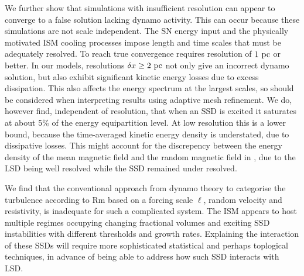 \documentclass[preprint2]{aastex63}
\newcommand\pc{~ {\rm pc}}
\newcommand\dx{ {\delta x}}
\begin{document}
We further show that simulations with insufficient resolution can appear to
converge to a false solution lacking dynamo activity. This can occur because
these simulations are not scale independent.
The SN energy input and the physically motivated ISM cooling processes impose
length and time scales that must be adequately resolved.
To reach true convergence requires resolution of $1\pc$ or better.
In our models, resolutions $\dx\geq2\pc$ not only give an incorrect dynamo
solution, but also exhibit significant kinetic energy losses due to excess
dissipation.
This also affects the energy spectrum at the largest scales, so should be 
considered when interpreting results using adaptive mesh refinement.
%
We do, however find, independent of resolution, that when an SSD is excited it
saturates at about 5\% of the energy equipartition level.
At low resolution this is a lower bound, because the time-averaged kinetic
energy density is understated, due to dissipative losses.
This might account for the discrepency between the energy density of the mean
magnetic field and the random magnetic field in \citet{Gent:2013b}, due to the
LSD being well resolved while the SSD remained under resolved.

We find that the conventional approach from dynamo theory to categorise the 
turbulence according to Rm based on a forcing scale $\ell$, random velocity and
resistivity, is inadequate for such a complicated system.
The ISM appears to host multiple regimes occupying changing fractional volumes
and exciting SSD instabilities with different thresholds and growth rates.
Explaining the interaction of these SSDs will require more sophisticated
statistical and perhaps toplogical techniques, in advance of being able to 
address how such SSD interacts with LSD.
\end{document}
